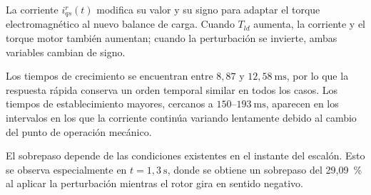 \documentclass[10pt,a4paper]{article}
\begin{document}
\begin{table}[H]
	\centering
	\caption{Indicadores de la respuesta de corriente y torque motor ante cambios de $T_l(t)$.}
	\label{tab:metricas_corriente_tld}
	
	\scriptsize
\end{table}
La corriente $i_{qs}^{r}(t)$ modifica su valor y su signo para adaptar el
torque electromagnético al nuevo balance de carga. Cuando $T_{ld}$ aumenta,
la corriente y el torque motor también aumentan; cuando la perturbación se
invierte, ambas variables cambian de signo.

Los tiempos de crecimiento se encuentran entre $8,87$ y
$12,58~\mathrm{ms}$, por lo que la respuesta rápida conserva un orden
temporal similar en todos los casos. Los tiempos de establecimiento
mayores, cercanos a $150$--$193~\mathrm{ms}$, aparecen en los intervalos en
los que la corriente continúa variando lentamente debido al cambio del
punto de operación mecánico.

El sobrepaso depende de las condiciones existentes en el instante del
escalón. Esto se observa especialmente en $t=1,3~\mathrm{s}$, donde se
obtiene un sobrepaso del 29,09~\% al aplicar la perturbación mientras el
rotor gira en sentido negativo.
\end{document}
